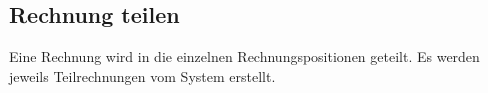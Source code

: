 \documentclass[../SubfileFeatures.tex]{subfiles}
\begin{document}
    \subsection{Rechnung teilen}
    Eine Rechnung wird in die einzelnen Rechnungspositionen geteilt.
    Es werden jeweils Teilrechnungen vom System erstellt.
\end{document}

